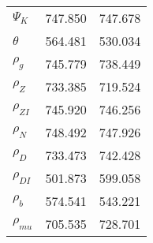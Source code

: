 \begin{center}
\begin{longtable}{lcc}
$ {\Psi_{K}}           $	 & 	     747.850	 & 	     747.678 \\ 
$ {\theta}             $	 & 	     564.481	 & 	     530.034 \\ 
$ {\rho_g}             $	 & 	     745.779	 & 	     738.449 \\ 
$ {\rho_Z}             $	 & 	     733.385	 & 	     719.524 \\ 
$ {\rho_{ZI}}          $	 & 	     745.920	 & 	     746.256 \\ 
$ {\rho_N}             $	 & 	     748.492	 & 	     747.926 \\ 
$ {\rho_D}             $	 & 	     733.473	 & 	     742.428 \\ 
$ {\rho_{DI}}          $	 & 	     501.873	 & 	     599.058 \\ 
$ {\rho_b}             $	 & 	     574.541	 & 	     543.221 \\ 
$ {\rho_{mu}}          $	 & 	     705.535	 & 	     728.701 \\ 
\end{longtable}
 \end{center}
